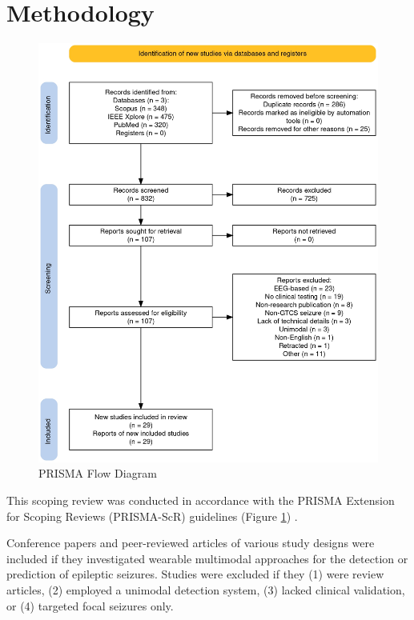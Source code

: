 \section{Methodology}
\begin{figure}
    \centering
    \includegraphics[width=1\textwidth]{methodology/figures/prisma_flow_diagram.jpg}
    \caption{PRISMA Flow Diagram}
    \label{fig:prisma_flow_diagram}
\end{figure}

This scoping review was conducted in accordance with the PRISMA Extension for Scoping Reviews (PRISMA-ScR) guidelines (Figure \ref{fig:prisma_flow_diagram}) \cite{Tricco2018-bb}.

Conference papers and peer-reviewed articles of various study designs were included if they investigated wearable multimodal approaches for the detection or prediction of epileptic seizures. Studies were excluded if they (1) were review articles, (2) employed a unimodal detection system, (3) lacked clinical validation, or (4) targeted focal seizures only.

